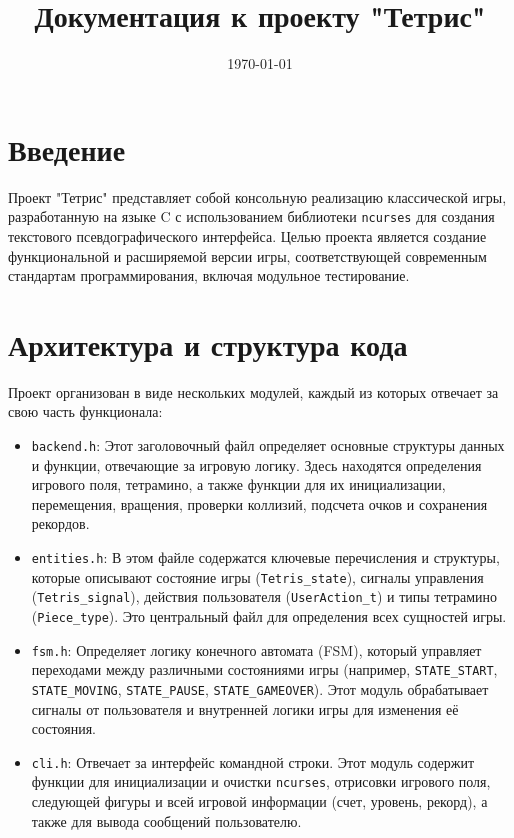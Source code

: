 \documentclass[12pt, a4paper]{article}
\title{Документация к проекту "Тетрис"}
\date{\today}
\begin{document}
\maketitle

\tableofcontents

\newpage

\section{Введение}

Проект "Тетрис" представляет собой консольную реализацию классической игры, разработанную на языке C с использованием библиотеки \texttt{ncurses} для создания текстового псевдографического интерфейса. Целью проекта является создание функциональной и расширяемой версии игры, соответствующей современным стандартам программирования, включая модульное тестирование.

\section{Архитектура и структура кода}

Проект организован в виде нескольких модулей, каждый из которых отвечает за свою часть функционала:

\begin{itemize}
    \item \texttt{backend.h}: Этот заголовочный файл определяет основные структуры данных и функции, отвечающие за игровую логику. Здесь находятся определения игрового поля, тетрамино, а также функции для их инициализации, перемещения, вращения, проверки коллизий, подсчета очков и сохранения рекордов.
    \item \texttt{entities.h}: В этом файле содержатся ключевые перечисления и структуры, которые описывают состояние игры (\texttt{Tetris\_state}), сигналы управления (\texttt{Tetris\_signal}), действия пользователя (\texttt{UserAction\_t}) и типы тетрамино (\texttt{Piece\_type}). Это центральный файл для определения всех сущностей игры.
    \item \texttt{fsm.h}: Определяет логику конечного автомата (FSM), который управляет переходами между различными состояниями игры (например, \texttt{STATE\_START}, \texttt{STATE\_MOVING}, \texttt{STATE\_PAUSE}, \texttt{STATE\_GAMEOVER}). Этот модуль обрабатывает сигналы от пользователя и внутренней логики игры для изменения её состояния.
    \item \texttt{cli.h}: Отвечает за интерфейс командной строки. Этот модуль содержит функции для инициализации и очистки \texttt{ncurses}, отрисовки игрового поля, следующей фигуры и всей игровой информации (счет, уровень, рекорд), а также для вывода сообщений пользователю.
\end{itemize}
\end{document}
